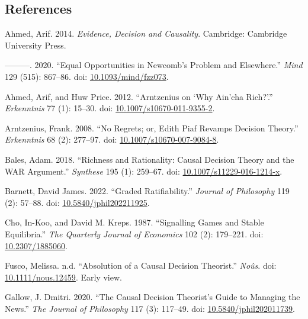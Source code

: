 \documentclass[
  10pt,
  letterpaper,
  DIV=11,
  numbers=noendperiod,
  twoside]{scrartcl}
\newlength{\cslhangindent}
\newenvironment{CSLReferences}[2] %
 {\begin{list}{}{%
  \setlength{\itemindent}{0pt}
  \setlength{\leftmargin}{0pt}
  \setlength{\parsep}{0pt}
  \ifodd #1
   \setlength{\leftmargin}{\cslhangindent}
   \setlength{\itemindent}{-1\cslhangindent}
  \fi
  \setlength{\itemsep}{#2\baselineskip}}}
 {\end{list}}
\begin{document}
\subsection*{References}\label{references}

\label{refs}
\begin{CSLReferences}{1}{0}
Ahmed, Arif. 2014. \emph{Evidence, Decision and Causality}. Cambridge:
{C}ambridge {U}niversity {P}ress.

---------. 2020. {``Equal Opportunities in Newcomb's Problem and
Elsewhere.''} \emph{Mind} 129 (515): 867--86. doi:
\href{https://doi.org/10.1093/mind/fzz073}{10.1093/mind/fzz073}.

Ahmed, Arif, and Huw Price. 2012. {``Arntzenius on `Why Ain'cha
Rich?'.''} \emph{Erkenntnis} 77 (1): 15--30. doi:
\href{https://doi.org/10.1007/s10670-011-9355-2}{10.1007/s10670-011-9355-2}.

Arntzenius, Frank. 2008. {``No Regrets; or, Edith Piaf Revamps Decision
Theory.''} \emph{Erkenntnis} 68 (2): 277--97. doi:
\href{https://doi.org/10.1007/s10670-007-9084-8}{10.1007/s10670-007-9084-8}.

Bales, Adam. 2018. {``Richness and Rationality: Causal Decision Theory
and the WAR Argument.''} \emph{Synthese} 195 (1): 259--67. doi:
\href{https://doi.org/10.1007/s11229-016-1214-x}{10.1007/s11229-016-1214-x}.

Barnett, David James. 2022. {``Graded Ratifiability.''} \emph{Journal of
Philosophy} 119 (2): 57--88. doi:
\href{https://doi.org/10.5840/jphil202211925}{10.5840/jphil202211925}.

Cho, In-Koo, and David M. Kreps. 1987. {``Signalling Games and Stable
Equilibria.''} \emph{The Quarterly Journal of Economics} 102 (2):
179--221. doi: \href{https://doi.org/10.2307/1885060}{10.2307/1885060}.

Fusco, Melissa. n.d. {``Absolution of a Causal Decision Theorist.''}
\emph{No{û}s}. doi:
\href{https://doi.org/10.1111/nous.12459}{10.1111/nous.12459}. Early
view.

Gallow, J. Dmitri. 2020. {``The Causal Decision Theorist's Guide to
Managing the News.''} \emph{The Journal of Philosophy} 117 (3): 117--49.
doi:
\href{https://doi.org/10.5840/jphil202011739}{10.5840/jphil202011739}.


\end{CSLReferences}
\end{document}
